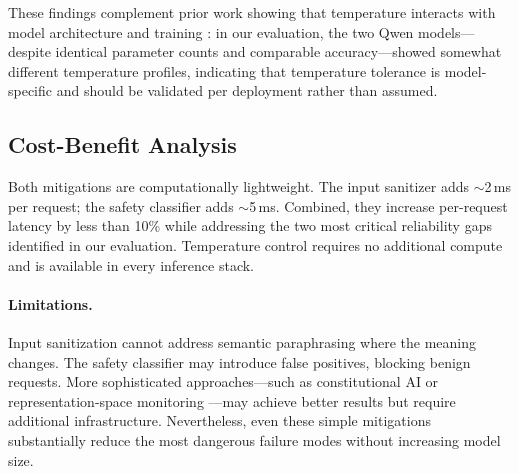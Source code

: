 These findings complement prior work showing that temperature interacts with model architecture and training \cite{deepseek2024r1, qwen2024}: in our evaluation, the two Qwen models---despite identical parameter counts and comparable accuracy---showed somewhat different temperature profiles, indicating that temperature tolerance is model-specific and should be validated per deployment rather than assumed.

\subsection{Cost-Benefit Analysis}

Both mitigations are computationally lightweight. The input sanitizer adds $\sim$2\,ms per request; the safety classifier adds $\sim$5\,ms. Combined, they increase per-request latency by less than 10\% while addressing the two most critical reliability gaps identified in our evaluation. Temperature control requires no additional compute and is available in every inference stack.

\paragraph{Limitations.} Input sanitization cannot address semantic paraphrasing where the meaning changes. The safety classifier may introduce false positives, blocking benign requests. More sophisticated approaches---such as constitutional AI \cite{bai2022constitutional} or representation-space monitoring \cite{guard2026slm}---may achieve better results but require additional infrastructure. Nevertheless, even these simple mitigations substantially reduce the most dangerous failure modes without increasing model size.
